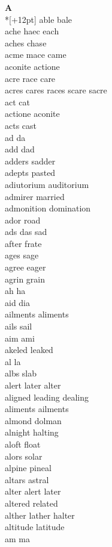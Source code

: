\vspace{14pt}
\noindent\textbf{\Large A}\\*[+12pt]
able bale\\
ache haec each\\
aches chase\\
acme mace came\\
aconite actione\\
acre race care\\
acres cares races scare sacre\\
act cat\\
actione aconite\\
acts cast\\
ad da\\
add dad\\
adders sadder\\
adepts pasted\\
adiutorium auditorium\\
admirer married\\
admonition domination\\
ador road\\
ads das sad\\
after frate\\
ages sage\\
agree eager\\
agrin grain\\
ah ha\\
aid dia\\
ailments aliments\\
ails sail\\
aim ami\\
akeled leaked\\
al la\\
albs slab\\
alert later alter\\
aligned leading dealing\\
aliments ailments\\
almond dolman\\
alnight halting\\
aloft float\\
alors solar\\
alpine pineal\\
altars astral\\
alter alert later\\
altered related\\
alther lather halter\\
altitude latitude\\
am ma\\
